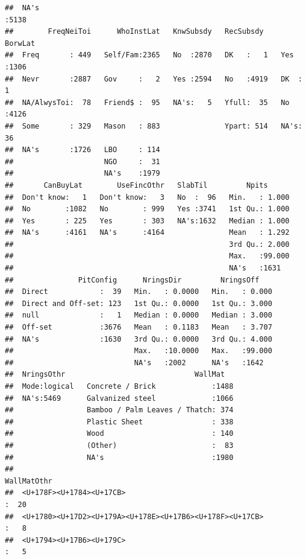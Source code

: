 \documentclass[11pt,]{article}
\begin{document}
\begin{verbatim}
##  NA's                                                                                                    :5138  
##        FreqNeiToi      WhoInstLat   KnwSubsdy   RecSubsdy    BorwLat    
##  Freq       : 449   Self/Fam:2365   No  :2870   DK   :   1   Yes :1306  
##  Nevr       :2887   Gov     :   2   Yes :2594   No   :4919   DK  :   1  
##  NA/AlwysToi:  78   Friend$ :  95   NA's:   5   Yfull:  35   No  :4126  
##  Some       : 329   Mason   : 883               Ypart: 514   NA's:  36  
##  NA's       :1726   LBO     : 114                                       
##                     NGO     :  31                                       
##                     NA's    :1979                                       
##       CanBuyLat        UseFincOthr   SlabTil         Npits       
##  Don't know:   1   Don't know:   3   No  :  96   Min.   : 1.000  
##  No        :1082   No        : 999   Yes :3741   1st Qu.: 1.000  
##  Yes       : 225   Yes       : 303   NA's:1632   Median : 1.000  
##  NA's      :4161   NA's      :4164               Mean   : 1.292  
##                                                  3rd Qu.: 2.000  
##                                                  Max.   :99.000  
##                                                  NA's   :1631    
##               PitConfig      NringsDir         NringsOff     
##  Direct            :  39   Min.   : 0.0000   Min.   : 0.000  
##  Direct and Off-set: 123   1st Qu.: 0.0000   1st Qu.: 3.000  
##  null              :   1   Median : 0.0000   Median : 3.000  
##  Off-set           :3676   Mean   : 0.1183   Mean   : 3.707  
##  NA's              :1630   3rd Qu.: 0.0000   3rd Qu.: 4.000  
##                            Max.   :10.0000   Max.   :99.000  
##                            NA's   :2002      NA's   :1642    
##  NringsOthr                              WallMat    
##  Mode:logical   Concrete / Brick             :1488  
##  NA's:5469      Galvanized steel             :1066  
##                 Bamboo / Palm Leaves / Thatch: 374  
##                 Plastic Sheet                : 338  
##                 Wood                         : 140  
##                 (Other)                      :  83  
##                 NA's                         :1980  
##                                                                            WallMatOthr  
##  <U+178F><U+1784><U+17CB>                                                        :  20  
##  <U+1780><U+17D2><U+179A><U+178E><U+17B6><U+178F><U+17CB>                        :   8  
##  <U+1794><U+17B6><U+179C>                                                        :   5  

\end{verbatim}
\end{document}
